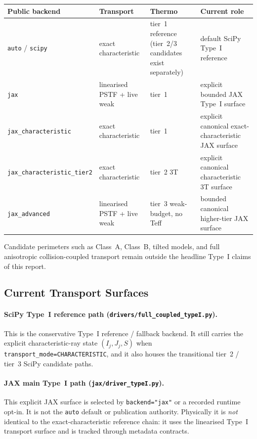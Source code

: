 \begin{center}
\renewcommand{\arraystretch}{1.12}
\begin{tabularx}{0.97\textwidth}{@{}p{}p{}p{}X@{}}
\toprule
Public backend & Transport & Thermo & Current role \\
\midrule
\texttt{auto} / \texttt{scipy} & exact characteristic & tier~1 reference (tier~2/3 candidates exist separately) & default SciPy Type~I reference \\
\texttt{jax} & linearised PSTF + live weak & tier~1 & explicit bounded JAX Type~I surface \\
\texttt{jax\_characteristic} & exact characteristic & tier~1 & explicit canonical exact-characteristic JAX surface \\
\texttt{jax\_characteristic\_tier2} & exact characteristic & tier~2 3T & explicit canonical characteristic 3T surface \\
\texttt{jax\_advanced} & linearised PSTF + live weak & tier~3 weak-budget, no Teff & bounded canonical higher-tier JAX surface \\
\bottomrule
\end{tabularx}
\end{center}

Candidate perimeters such as Class~A, Class~B, tilted models, and full anisotropic collision-coupled transport remain outside the headline Type~I claims of this report.

\subsection{Current Transport Surfaces}

\paragraph{SciPy Type~I reference path (\texttt{drivers/full\_coupled\_typeI.py}).}
This is the conservative Type~I reference / fallback backend.  It still carries the explicit characteristic-ray state $(I_j,J_j,S)$ when \texttt{transport\_mode=CHARACTERISTIC}, and it also houses the transitional tier~2 / tier~3 SciPy candidate paths.

\paragraph{JAX main Type~I path (\texttt{jax/driver\_typeI.py}).}
This explicit JAX surface is selected by \texttt{backend="jax"} or a recorded runtime opt-in.  It is not the \texttt{auto} default or publication authority.  Physically it is \emph{not} identical to the exact-characteristic reference chain: it uses the linearised Type~I transport surface and is tracked through metadata contracts.

